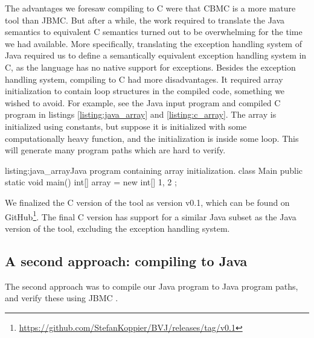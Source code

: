The advantages we foresaw compiling to C were that CBMC is a more mature tool than
JBMC. But after a while, the work required to translate the Java semantics to 
equivalent C semantics turned out to be overwhelming for the time we had available. 
More specifically, translating the exception handling system of Java required us 
to define a semantically equivalent exception handling system in C, as the 
language has no native support for exceptions. Besides the exception handling system, 
compiling to C had more disadvantages. It required array initialization to contain 
loop structures in the compiled code, something we wished to avoid. For example, 
see the Java input program and compiled C program in listings \ref{listing:java_array} 
and \ref{listing:c_array}. The array is initialized using constants, but suppose it 
is initialized with some computationally heavy function, and the initialization 
is inside some loop. This will generate many program paths which are hard to verify.

\begin{Java}{listing:java_array}{Java program containing array initialization.}
class Main {
    public static void main() {
        int[] array = new int[] { 1, 2 };
    }
}
\end{Java}


We finalized the C version of the tool as version v0.1, which can be found on 
GitHub\footnote{\url{https://github.com/StefanKoppier/BVJ/releases/tag/v0.1}}.
The final C version has support for a similar Java subset as the Java version of
the tool, excluding the exception handling system.

\subsection*{A second approach: compiling to Java}
The second approach was to compile our Java program to Java program paths, and
verify these using JBMC \cite{ckkst2018}. 

